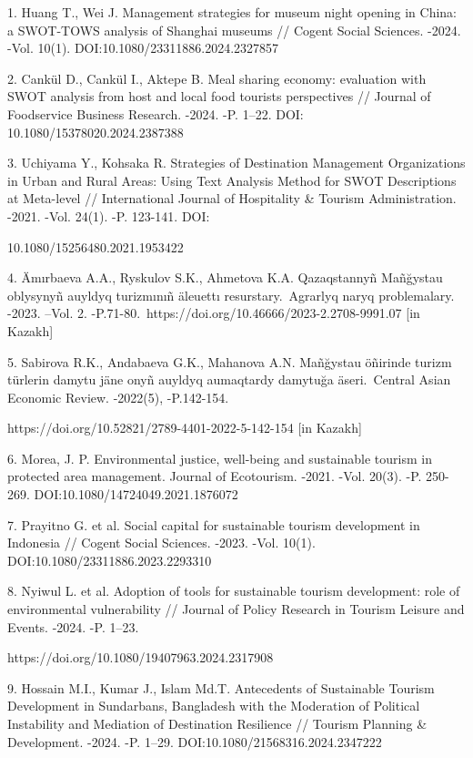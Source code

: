 \begin{noparindent}
1.
  Huang T., Wei J. Management strategies for museum night opening in
  China: a SWOT-TOWS analysis of Shanghai museums // Cogent Social
  Sciences. -2024. -Vol. 10(1). DOI:10.1080/23311886.2024.2327857

2.
  Cankül D., Cankül I., Aktepe B. Meal sharing economy: evaluation with
  SWOT analysis from host and local food tourists perspectives //
  Journal of Foodservice Business Research. -2024. -P. 1--22. DOI:
  10.1080/15378020.2024.2387388

3.
  Uchiyama Y., Kohsaka R. Strategies of Destination Management
  Organizations in Urban and Rural Areas: Using Text Analysis Method for
  SWOT Descriptions at Meta-level // International Journal of
  Hospitality \& Tourism Administration. -2021. -Vol. 24(1). -P.
  123-141. DOI:

10.1080/15256480.2021.1953422

4.
  Ämırbaeva A.A., Ryskulov S.K., Ahmetova K.A. Qazaqstannyñ Mañğystau
  oblysynyñ auyldyq turizmınıñ äleuettı resurstary.~Agrarlyq naryq
  problemalary. -2023. --Vol. 2.
  -P.71-80.~https://doi.org/10.46666/2023-2.2708-9991.07 {[}in Kazakh{]}

5.
  Sabirova R.K., Andabaeva G.K., Mahanova A.N. Mañğystau öñirinde turizm
  türlerin damytu jäne onyñ auyldyq aumaqtardy damytuğa äseri.~Central
  Asian Economic Review. -2022(5), -P.142-154.
  
  https://doi.org/10.52821/2789-4401-2022-5-142-154 {[}in Kazakh{]}

6.
  Morea, J. P. Environmental justice, well-being and sustainable tourism
  in protected area management. Journal of Ecotourism. -2021. -Vol.
  20(3). -P. 250-269. DOI:10.1080/14724049.2021.1876072

7.
  Prayitno G. et al. Social capital for sustainable tourism development
  in Indonesia // Cogent Social Sciences. -2023. -Vol. 10(1).
  DOI:10.1080/23311886.2023.2293310

8.
  Nyiwul L. et al. Adoption of tools for sustainable tourism
  development: role of environmental vulnerability // Journal of Policy
  Research in Tourism Leisure and Events. -2024. -P. 1--23.
  
  https://doi.org/10.1080/19407963.2024.2317908

9.
  Hossain M.I., Kumar J., Islam Md.T. Antecedents of Sustainable Tourism
  Development in Sundarbans, Bangladesh with the Moderation of Political
  Instability and Mediation of Destination Resilience // Tourism
  Planning \& Development. -2024. -P. 1--29.
  DOI:10.1080/21568316.2024.2347222


\end{noparindent}
